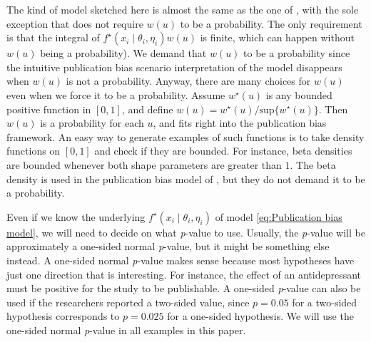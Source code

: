 \documentclass[useAMS,usenatbib,referee]{biom}
\begin{document}
The kind of model sketched here is almost the same as the one of \citet{hedges1992modeling}, with the sole exception that \citet{hedges1992modeling} does not require $w(u)$ to be a probability. The only requirement is that the integral of $f^{\star}(x_{i}\mid\theta_{i},\eta_{i})w(u)$ is finite, which can happen without $w(u)$ being a probability). We demand that $w(u)$ to be a probability since the intuitive publication bias scenario interpretation of the model disappears when $w(u)$ is not a probability. Anyway, there are many choices for $w(u)$ even when we force it to be a probability. Assume $w^{\star}(u)$ is any bounded positive function in $\left[0,1\right]$, and define $w(u)=w^{\star}(u)/\textrm{sup}\{w^{\star}(u)\}$. Then $w(u)$ is a probability for each $u$, and fits right into the publication bias framework. An easy way to generate examples of such functions is to take density functions on $\left[0,1\right]$ and check if they are bounded. For instance, beta densities are bounded whenever both shape parameters are greater than $1$. The beta density is used in the publication bias model of \citet{citkowicz2017parsimonious}, but they do not demand it to be a probability.

Even if we know the underlying $f^{\star}(x_{i}\mid\theta_{i},\eta_{i})$ of model \eqref{eq:Publication bias model}, we will need to decide on what \textit{p}-value to use. Usually, the \textit{p}-value will be approximately a one-sided normal \textit{p}-value, but it might be something
else instead. A one-sided normal \textit{p}-value makes sense because most hypotheses have just one direction that is interesting. For instance, the effect of an antidepressant must be positive for the study to be publishable. A one-sided \textit{p}-value can also be used if the researchers reported a two-sided value, since $p=0.05$ for a two-sided hypothesis corresponds to $p=0.025$ for a one-sided hypothesis. We will use the one-sided normal \textit{p}-value in all examples in this paper.
\end{document}
